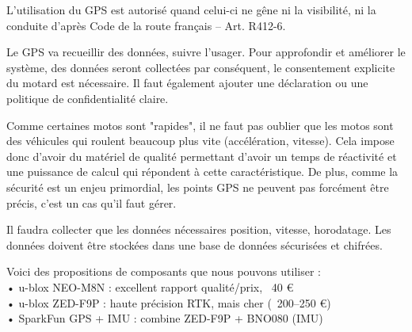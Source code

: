 L'utilisation du GPS est autorisé quand celui-ci ne gêne ni la visibilité, ni la conduite d'après Code de la route français – Art. R412-6\cite{loi_code_de_la_route}.

Le GPS va recueillir des données, suivre l'usager. Pour approfondir et améliorer le système, des données seront collectées par conséquent, le consentement explicite du motard est nécessaire. Il faut également ajouter une déclaration ou une politique de confidentialité claire.

Comme certaines motos sont "rapides", il ne faut pas oublier que les motos sont des véhicules qui roulent beaucoup plus vite (accélération, vitesse). Cela impose donc d'avoir du matériel de qualité permettant d'avoir un temps de réactivité et une puissance de calcul qui répondent à cette caractéristique. De plus, comme la sécurité est un enjeu primordial, les points GPS ne peuvent pas forcément être précis, c'est un cas qu'il faut gérer.

Il faudra collecter que les données nécessaires position, vitesse, horodatage. Les données doivent être stockées dans une base de données sécurisées et chifrées.

Voici des propositions de composants que nous pouvons utiliser : 	\\
•	u-blox NEO-M8N : excellent rapport qualité/prix, ~40 € \\
•	u-blox ZED-F9P : haute précision RTK, mais cher (~200–250 €) \\
•	SparkFun GPS + IMU : combine ZED-F9P + BNO080 (IMU)\\




